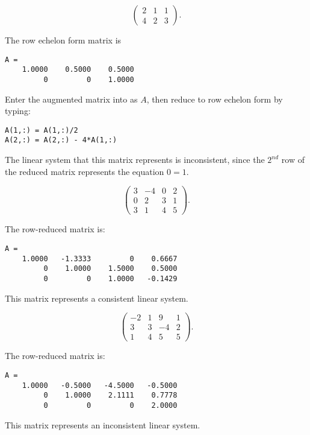 \documentclass{ximera}
\begin{document}
\begin{exercise} \label{c2.3.1a}
\[
\left(\begin{array}{rrr}
 2 &  1  &  1   \\
 4 &  2  &  3
\end{array}\right).
\]

\begin{solution}
\ans The row echelon form matrix is
\begin{verbatim}
A = 
    1.0000    0.5000    0.5000
         0         0    1.0000
\end{verbatim}
\soln Enter the augmented matrix into \Matlab as $A$, then reduce to
row echelon form by typing:
\begin{verbatim}
A(1,:) = A(1,:)/2
A(2,:) = A(2,:) - 4*A(1,:)
\end{verbatim}
The linear system that this matrix represents is inconsistent, since
the $2^{nd}$ row of the reduced matrix represents the equation $0 = 1$.

\end{solution}
\end{exercise}
\begin{exercise} \label{c2.3.1b}
\[
\left(\begin{array}{rrrr}
 3  & -4 & 0 & 2\\
 0  &  2 & 3 & 1\\
 3  &  1 & 4 & 5
\end{array}\right).
\]

\begin{solution}
The row-reduced matrix is:
\begin{verbatim}
A =
    1.0000   -1.3333         0    0.6667
         0    1.0000    1.5000    0.5000
         0         0    1.0000   -0.1429
\end{verbatim}
This matrix represents a consistent linear system.

\end{solution}
\end{exercise}
\begin{exercise} \label{c2.3.1c}
\[
\left(\begin{array}{rrrr}
 -2 & 1 &  9 & 1\\
  3 & 3 & -4 & 2\\
  1 & 4 &  5 & 5
\end{array}\right).
\]

\begin{solution}
The row-reduced matrix is:
\begin{verbatim}
A =
    1.0000   -0.5000   -4.5000   -0.5000
         0    1.0000    2.1111    0.7778
         0         0         0    2.0000
\end{verbatim}
This matrix represents an inconsistent linear system.


\end{solution}
\end{exercise}
\end{document}
